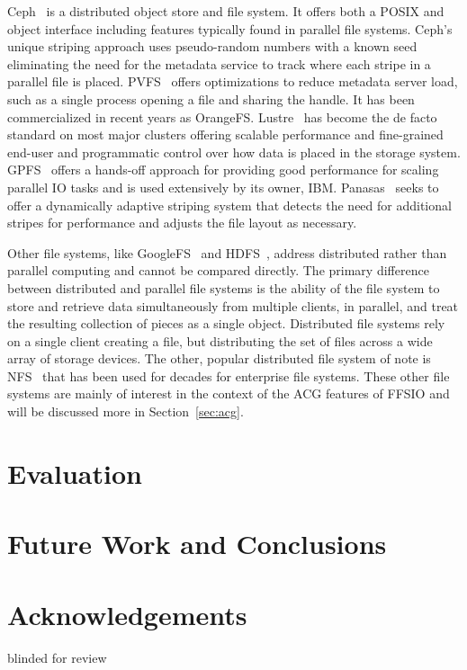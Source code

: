 \documentclass{sig-alt-gov2}
\begin{document}
Ceph~\cite{weil:ceph} is a distributed object store and file system. It offers
both a POSIX and object interface including features typically found in parallel
file systems.
Ceph's unique striping approach uses pseudo-random numbers with a
known seed eliminating the need for the metadata service to track where each
stripe in a parallel file is placed.
PVFS~\cite{carns:pvfs} offers optimizations to reduce metadata server load,
such as a single process opening a file and sharing the handle.
It has been
commercialized in recent years as OrangeFS.
Lustre~\cite{braam:lustre-arch} has become the de facto standard on most major
clusters offering scalable performance and fine-grained end-user and
programmatic control over how data is placed in the storage system.
GPFS~\cite{schmuck:gpfs} offers a hands-off approach for providing good
performance for scaling parallel IO tasks and is used extensively by its owner,
IBM.
Panasas~\cite{panasas:architecture} seeks to offer a dynamically adaptive
striping system that detects the need for additional stripes for performance
and adjusts the file layout as necessary.

Other file systems, like GoogleFS~\cite{ghemawat:googlefs} and
HDFS~\cite{Shvachko:2010:hdfs}, address distributed rather than parallel
computing and cannot be compared directly.
The primary difference between
distributed and parallel file systems is the ability of the file system to
store and retrieve data simultaneously from multiple clients, in parallel, and
treat the resulting collection of pieces as a single object.  Distributed file
systems rely on a single client creating a file, but distributing the set of
files across a wide array of storage devices.
The other, popular distributed
file system of note is NFS~\cite{powlowski:1994:nfs3} that has been used for
decades for enterprise file systems.
These other file systems are mainly of
interest in the context of the ACG features of FFSIO and will be discussed more
in Section~\ref{sec:acg}.

\section{Evaluation}
\label{performance}


\section{Future Work and Conclusions}
\label{future}


\section{Acknowledgements}

blinded for review





\vfill\eject
\end{document}
